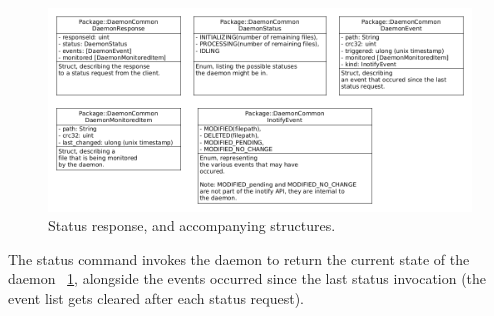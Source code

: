 \begin{figure}[h]
    \centering
    \includegraphics[width=12cm]{figures/daemon/daemon_response}
    \caption{Status response, and accompanying structures.}
    \label{fig:daemon_fig_2}
\end{figure}


The status command invokes the daemon to return the current state of the daemon ~\ref{fig:daemon_fig_2}, alongside the events occurred since the
last status invocation (the event list gets cleared after each status request).
